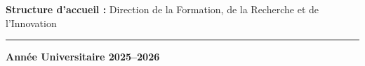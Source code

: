 \begin{titlepage}
\begin{center}
    \vspace{0.22cm}

    {\scriptsize
    \textbf{Structure d'accueil :}
    Direction de la Formation, de la Recherche et de l'Innovation}

    \vspace{0.25cm}

    {\color{PrimaryRed}\rule{0.70\linewidth}{0.6pt}}

    \vspace{0.18cm}

    {\small\bfseries Année Universitaire 2025--2026}

  \end{center}

\end{titlepage}